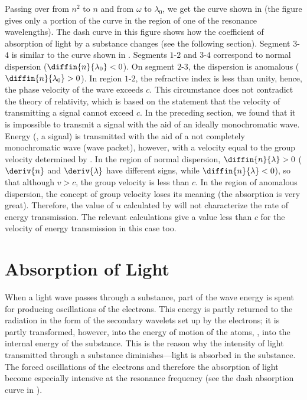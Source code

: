 Passing over from $n^2$ to $n$ and from $\omega$ to $\lambda_0$, we get the curve shown in  (the figure gives only a portion of the curve in the region of one of the resonance wavelengths).
The dash curve in this figure shows how the coefficient of absorption of light by a substance changes (see the following section).
Segment $3$-$4$ is similar to the curve shown in .
Segments $1$-$2$ and $3$-$4$ correspond to normal dispersion ($\diffin{n}{\lambda_0}<0$).
On segment $2$-$3$, the dispersion is anomalous ($\diffin{n}{\lambda_0}>0$).
In region $1$-$2$, the refractive index is less than unity, hence, the phase velocity of the wave exceeds $c$.
This circumstance does not contradict the theory of relativity, which is based on the statement that the velocity of transmitting a signal cannot exceed $c$.
In the preceding section, we found that it is impossible to transmit a signal with the aid of an ideally monochromatic wave.
Energy (\ie, a signal) is transmitted with the aid of a not completely monochromatic wave (wave packet), however, with a velocity equal to the group velocity determined by .
In the region of normal dispersion, $\diffin{n}{\lambda}>0$ ($\deriv{n}$ and $\deriv{\lambda}$ have different signs, while
$\diffin{n}{\lambda}<0$), so that although $v>c$, the group velocity is less than $c$.
In the region of anomalous dispersion, the concept of group velocity loses its meaning (the absorption is very great).
Therefore, the value of $u$ calculated by  will not characterize the rate of energy transmission.
The relevant calculations give a value less than $c$ for the velocity of energy transmission in this case too.

\section{Absorption of Light}\label{sec:20_4}

When a light wave passes through a substance, part of the wave energy is spent for producing oscillations of the electrons.
This energy is partly returned to the radiation in the form of the secondary wavelets set up by the electrons; it is partly transformed, however, into the energy of motion of the atoms, \ie, into the internal energy of the substance.
This is the reason why the intensity of light transmitted through a substance diminishes---light is absorbed in the substance.
The forced oscillations of the electrons and therefore the absorption of light become especially intensive at the resonance frequency (see the dash absorption curve in ).

